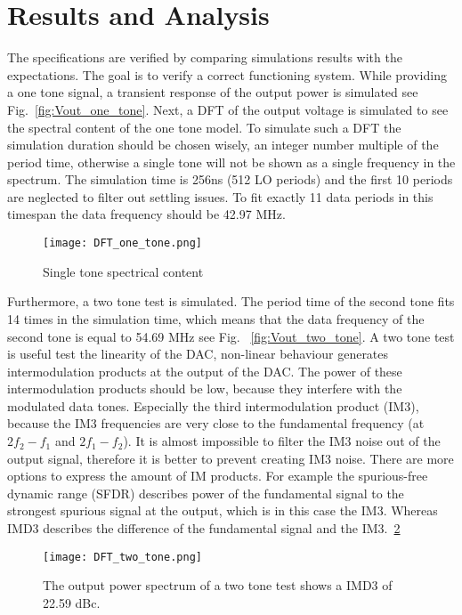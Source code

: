 \section{Results and Analysis}\label{sec:simulations}
The specifications are verified by comparing simulations results with the expectations. The goal is to verify a correct functioning system. While providing a one tone signal, a transient response of the output power is simulated see Fig.~\ref{fig:Vout_one_tone}.
Next, a DFT of the output voltage is simulated to see the spectral content of the one tone model. To simulate such a DFT the simulation duration should be chosen wisely, an integer number multiple of the period time, otherwise a single tone will not be shown as a single frequency in the spectrum. The simulation time is 256ns (512 LO periods) and the first 10 periods are neglected to filter out settling issues. To fit exactly 11 data periods in this timespan the data frequency should be 42.97 MHz.
\begin{figure}[h] 
\texttt{[image: DFT\_one\_tone.png]}
\caption{Single tone spectrical content}
\label{fig:transient_single_tone}
\end{figure}
Furthermore, a two tone test is simulated. The period time of the second tone fits 14 times in the simulation time, which means that the data frequency of the second tone is equal to 54.69 MHz see Fig. ~\ref{fig:Vout_two_tone}. A two tone test is useful test the linearity of the DAC, non-linear behaviour generates intermodulation products at the output of the DAC. The power of these intermodulation products should be low, because they interfere with the modulated data tones. Especially the third intermodulation product (IM3), because the IM3 frequencies are very close to the fundamental frequency (at $2f_2-f_1$ and $2f_1-f_2$). It is almost impossible to filter the IM3 noise out of the output signal, therefore it is better to prevent creating IM3 noise. There are more options to express the amount of IM products. For example the spurious-free dynamic range (SFDR) describes power of the fundamental signal to the strongest spurious signal at the output, which is in this case the IM3. Whereas IMD3 describes the difference of the fundamental signal and the IM3.~\ref{fig:DFT_two_tone}
\begin{figure}[h] 
\texttt{[image: DFT\_two\_tone.png]}
\caption{The output power spectrum of a two tone test shows a IMD3 of 22.59 dBc.}
\label{fig:DFT_two_tone}
\end{figure}

